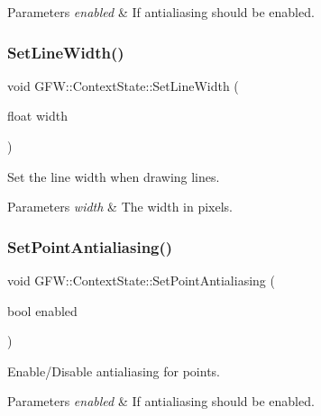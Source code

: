 \begin{DoxyParams}{Parameters}
{\em enabled} & If antialiasing should be enabled. \\
\hline
\end{DoxyParams}
\mbox{\label{class_g_f_w_1_1_context_state_a0cbbcf527df67fec78f9e9e834b7f562}} 
\subsubsection{\texorpdfstring{Set\+Line\+Width()}{SetLineWidth()}}
{\footnotesize\ttfamily void G\+F\+W\+::\+Context\+State\+::\+Set\+Line\+Width (\begin{DoxyParamCaption}\item[{float}]{width }\end{DoxyParamCaption})}



Set the line width when drawing lines. 


\begin{DoxyParams}{Parameters}
{\em width} & The width in pixels. \\
\hline
\end{DoxyParams}
\mbox{\label{class_g_f_w_1_1_context_state_a0efa713914d80597e2f5b6e225190818}} 
\subsubsection{\texorpdfstring{Set\+Point\+Antialiasing()}{SetPointAntialiasing()}}
{\footnotesize\ttfamily void G\+F\+W\+::\+Context\+State\+::\+Set\+Point\+Antialiasing (\begin{DoxyParamCaption}\item[{bool}]{enabled }\end{DoxyParamCaption})}



Enable/\+Disable antialiasing for points. 


\begin{DoxyParams}{Parameters}
{\em enabled} & If antialiasing should be enabled. \\
\hline
\end{DoxyParams}
\mbox{\label{class_g_f_w_1_1_context_state_a916f5ca06b29cb5a506759748cb9bb75}} 
